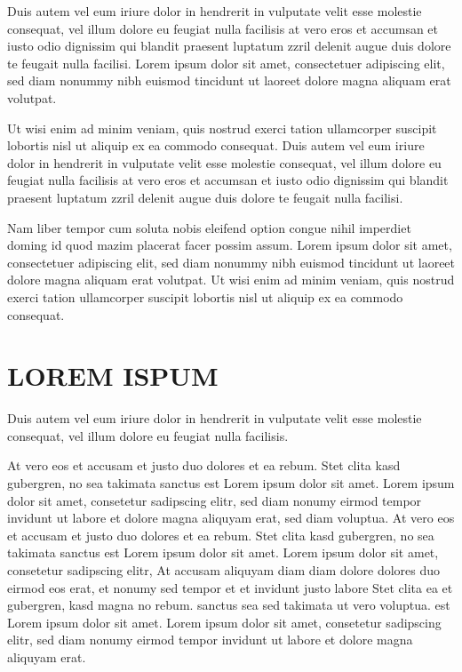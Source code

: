 \documentclass[]{../metanetpaper}
\begin{document}
Duis autem vel eum iriure dolor in hendrerit in vulputate velit esse molestie consequat, vel illum dolore eu feugiat nulla facilisis at vero eros et accumsan et iusto odio dignissim qui blandit praesent luptatum zzril delenit augue duis dolore te feugait nulla facilisi. Lorem ipsum dolor sit amet, consectetuer adipiscing elit, sed diam nonummy nibh euismod tincidunt ut laoreet dolore magna aliquam erat volutpat.   

Ut wisi enim ad minim veniam, quis nostrud exerci tation ullamcorper suscipit lobortis nisl ut aliquip ex ea commodo consequat. Duis autem vel eum iriure dolor in hendrerit in vulputate velit esse molestie consequat, vel illum dolore eu feugiat nulla facilisis at vero eros et accumsan et iusto odio dignissim qui blandit praesent luptatum zzril delenit augue duis dolore te feugait nulla facilisi.   

Nam liber tempor cum soluta nobis eleifend option congue nihil imperdiet doming id quod mazim placerat facer possim assum. Lorem ipsum dolor sit amet, consectetuer adipiscing elit, sed diam nonummy nibh euismod tincidunt ut laoreet dolore magna aliquam erat volutpat. Ut wisi enim ad minim veniam, quis nostrud exerci tation ullamcorper suscipit lobortis nisl ut aliquip ex ea commodo consequat.   
\section{LOREM ISPUM}
Duis autem vel eum iriure dolor in hendrerit in vulputate velit esse molestie consequat, vel illum dolore eu feugiat nulla facilisis.   

At vero eos et accusam et justo duo dolores et ea rebum. Stet clita kasd gubergren, no sea takimata sanctus est Lorem ipsum dolor sit amet. Lorem ipsum dolor sit amet, consetetur sadipscing elitr, sed diam nonumy eirmod tempor invidunt ut labore et dolore magna aliquyam erat, sed diam voluptua. At vero eos et accusam et justo duo dolores et ea rebum. Stet clita kasd gubergren, no sea takimata sanctus est Lorem ipsum dolor sit amet. Lorem ipsum dolor sit amet, consetetur sadipscing elitr, At accusam aliquyam diam diam dolore dolores duo eirmod eos erat, et nonumy sed tempor et et invidunt justo labore Stet clita ea et gubergren, kasd magna no rebum. sanctus sea sed takimata ut vero voluptua. est Lorem ipsum dolor sit amet. Lorem ipsum dolor sit amet, consetetur sadipscing elitr, sed diam nonumy eirmod tempor invidunt ut labore et dolore magna aliquyam erat.   
\end{document}
